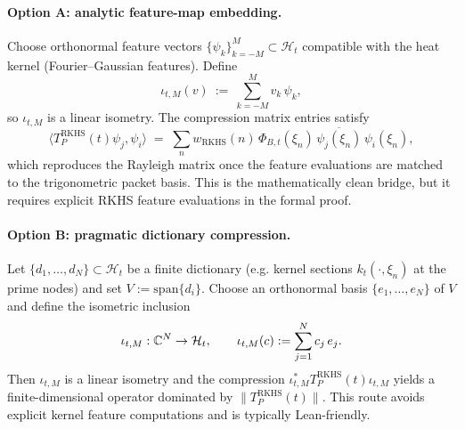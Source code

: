 \paragraph{Option A: analytic feature-map embedding.}
Choose orthonormal feature vectors $\{\psi_k\}_{k=-M}^M\subset\mathcal H_t$
compatible with the heat kernel (Fourier--Gaussian features).  Define
\[
  \iota_{t,M}(v)\ :=\ \sum_{k=-M}^{M} v_k\,\psi_k,
\]
so $\iota_{t,M}$ is a linear isometry.  The compression matrix entries satisfy
\[
  \langle T_P^{\mathrm{RKHS}}(t)\psi_j,\psi_i\rangle
  \;=\;\sum_n w_{\mathrm{RKHS}}(n)\,\Phi_{B,t}(\xi_n)\,
  \overline{\psi_j(\xi_n)}\,\psi_i(\xi_n),
\]
which reproduces the Rayleigh matrix once the feature evaluations are matched
to the trigonometric packet basis.  This is the mathematically clean bridge,
but it requires explicit RKHS feature evaluations in the formal proof.

\paragraph{Option B: pragmatic dictionary compression.}
Let $\{d_1,\dots,d_N\}\subset\mathcal H_t$ be a finite dictionary (e.g. kernel
sections $k_t(\cdot,\xi_n)$ at the prime nodes) and set
$V:=\mathrm{span}\{d_i\}$.  Choose an orthonormal basis
$\{e_1,\dots,e_N\}$ of $V$ and define the isometric inclusion
\[
  \iota_{t,M}:\mathbb C^N\to \mathcal H_t,\qquad \iota_{t,M}(c):=\sum_{j=1}^{N} c_j\,e_j.
\]
Then $\iota_{t,M}$ is a linear isometry and the compression
$\iota_{t,M}^\ast T_P^{\mathrm{RKHS}}(t)\iota_{t,M}$ yields a finite-dimensional
operator dominated by $\|T_P^{\mathrm{RKHS}}(t)\|$.  This route avoids explicit
kernel feature computations and is typically Lean-friendly.
